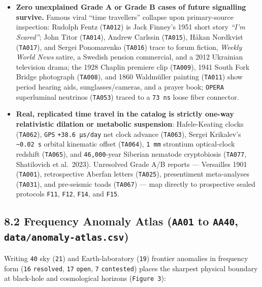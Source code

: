 \documentclass[10pt,letterpaper]{article}
\providecommand{\tightlist}{\setlength{\itemsep}{1pt}\setlength{\parskip}{0pt}}
\begin{document}
\begin{itemize}
\tightlist
\item
  \textbf{Zero unexplained Grade A or Grade B cases of future signalling
  survive.} Famous viral ``time travellers'' collapse upon
  primary-source inspection: Rudolph Fentz (\texttt{TA012}) is Jack
  Finney's 1951 short story \emph{``I'm Scared''}; John Titor
  (\texttt{TA014}), Andrew Carlssin (\texttt{TA015}), Håkan Nordkvist
  (\texttt{TA017}), and Sergei Ponomarenko (\texttt{TA016}) trace to
  forum fiction, \emph{Weekly World News} satire, a Swedish pension
  commercial, and a 2012 Ukrainian television drama; the 1928 Chaplin
  premiere clip (\texttt{TA009}), 1941 South Fork Bridge photograph
  (\texttt{TA008}), and 1860 Waldmüller painting (\texttt{TA011}) show
  period hearing aids, sunglasses/cameras, and a prayer book;
  \texttt{OPERA} superluminal neutrinos (\texttt{TA053}) traced to a
  \texttt{73\ ns} loose fiber connector.
\item
  \textbf{Real, replicated time travel in the catalog is strictly
  one-way relativistic dilation or metabolic suspension}: Hafele-Keating
  clocks (\texttt{TA062}), \texttt{GPS} \texttt{+38.\allowbreak{}6\ µs/\allowbreak{}day} net clock
  advance (\texttt{TA063}), Sergei Krikalev's
  \texttt{\textasciitilde{}0.02\ s} orbital kinematic offset
  (\texttt{TA064}), \texttt{1\ mm} strontium optical-clock redshift
  (\texttt{TA065}), and \texttt{46,000}-year Siberian nematode
  cryptobiosis (\texttt{TA077}, Shatilovich et al.~2023). Unresolved
  Grade A/B reports --- Versailles 1901 (\texttt{TA001}), retrospective
  Aberfan letters (\texttt{TA025}), presentiment meta-analyses
  (\texttt{TA031}), and pre-seismic toads (\texttt{TA067}) --- map
  directly to prospective sealed protocols \texttt{F11}, \texttt{F12},
  \texttt{F14}, and \texttt{F15}.
\end{itemize}

\subsection{\texorpdfstring{8.2 Frequency Anomaly Atlas (\texttt{AA01}
to \texttt{AA40},
\texttt{data/\allowbreak{}anomaly-\allowbreak{}atlas.\allowbreak{}csv})}{8.2 Frequency Anomaly Atlas (AA01 to AA40, data/anomaly-atlas.csv)}}\label{frequency-anomaly-atlas-aa01-to-aa40-dataanomaly-atlas.csv}

Writing \texttt{40} sky (\texttt{21}) and Earth-laboratory (\texttt{19})
frontier anomalies in frequency form (\texttt{16} \texttt{resolved},
\texttt{17} \texttt{open}, \texttt{7} \texttt{contested}) places the
sharpest physical boundary at black-hole and cosmological horizons
(\texttt{Figure\ 3}):
\end{document}
